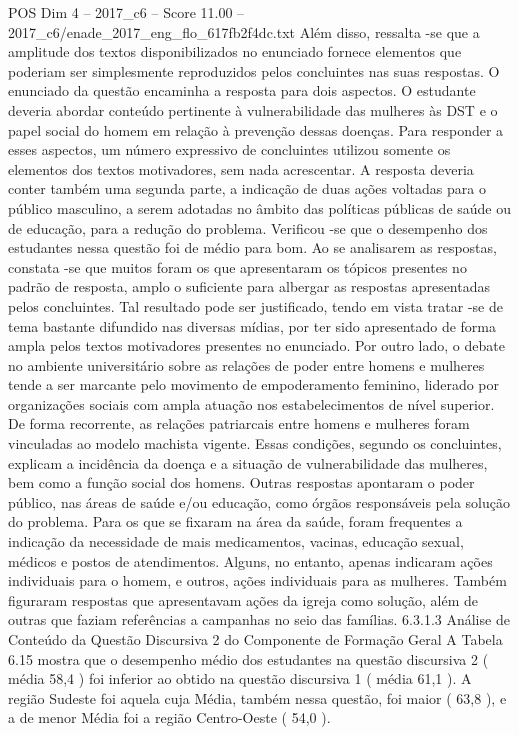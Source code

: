 \begin{textsample}{POS Dim 4 – 2017\_c6 – Score 11.00 – 2017\_c6/enade\_2017\_eng\_flo\_617fb2f4dc.txt}
Além disso, ressalta -se que a amplitude dos textos disponibilizados no enunciado fornece elementos que poderiam ser simplesmente reproduzidos pelos concluintes nas suas respostas.
O enunciado da questão encaminha a resposta para dois aspectos.
O estudante deveria abordar conteúdo pertinente à vulnerabilidade das mulheres às DST e o papel social do homem em relação à prevenção dessas doenças.
Para responder a esses aspectos, um número expressivo de concluintes utilizou somente os elementos dos textos motivadores, sem nada acrescentar.
A resposta deveria conter também uma segunda parte, a indicação de duas ações voltadas para o público masculino, a serem adotadas no âmbito das políticas públicas de saúde ou de educação, para a redução do problema.
Verificou -se que o desempenho dos estudantes nessa questão foi de médio para bom.
Ao se analisarem as respostas, constata -se que muitos foram os que apresentaram os tópicos presentes no padrão de resposta, amplo o suficiente para albergar as respostas apresentadas pelos concluintes.
Tal resultado pode ser justificado, tendo em vista tratar -se de tema bastante difundido nas diversas mídias, por ter sido apresentado de forma ampla pelos textos motivadores presentes no enunciado.
Por outro lado, o debate no ambiente universitário sobre as relações de poder entre homens e mulheres tende a ser marcante pelo movimento de empoderamento feminino, liderado por organizações sociais com ampla atuação nos estabelecimentos de nível superior.
De forma recorrente, as relações patriarcais entre homens e mulheres foram vinculadas ao modelo machista vigente.
Essas condições, segundo os concluintes, explicam a incidência da doença e a situação de vulnerabilidade das mulheres, bem como a função social dos homens.
Outras respostas apontaram o poder público, nas áreas de saúde e/ou educação, como órgãos responsáveis pela solução do problema.
Para os que se fixaram na área da saúde, foram frequentes a indicação da necessidade de mais medicamentos, vacinas, educação sexual, médicos e postos de atendimentos.
Alguns, no entanto, apenas indicaram ações individuais para o homem, e outros, ações individuais para as mulheres.
Também figuraram respostas que apresentavam ações da igreja como solução, além de outras que faziam referências a campanhas no seio das famílias. 6.3.1.3 Análise de Conteúdo da Questão Discursiva 2 do Componente de Formação Geral A Tabela 6.15 mostra que o desempenho médio dos estudantes na questão discursiva 2 ( média 58,4 ) foi inferior ao obtido na questão discursiva 1 ( média 61,1 ).
A região Sudeste foi aquela cuja Média, também nessa questão, foi maior ( 63,8 ), e a de menor Média foi a região Centro-Oeste ( 54,0 ).

\end{textsample}

